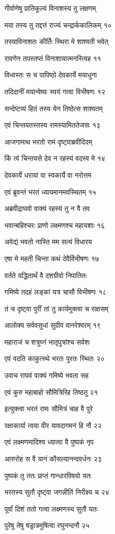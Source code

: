 गीर्वाणेषु प्रातिकूल्यं विनाशस्य तु लक्षणम्

मया तस्य तु तद्दत्तं राज्यं चन्द्रार्ककालिकम् १०

तस्याविनाशतः कीर्तिः स्थिरा मे शाश्वती भवेत्

रावणेन तपस्तप्तं विनाशायात्मनस्त्विह ११

विध्वस्तः स च पापिष्ठो देवकार्ये मयाधुना

तदिदानीं मयान्वेष्यः स्वयं गत्वा विभीषणः १२

सन्देष्टव्यं हितं तस्य येन तिष्ठेत्स शाश्वतम्

एवं चिन्तयतस्तस्य रामस्यामिततेजसः १३

आजगामाथ भरतो रामं दृष्ट्वाब्रवीदिदम्

किं त्वं चिन्तयसे देव न रहस्यं वदस्व मे १४

देवकार्ये धरायां वा स्वकार्ये वा नरोत्तम

एवं ब्रुवन्तं भरतं ध्यायमानमवस्थितम् १५

अब्रवीद्राघवो वाक्यं रहस्यं तु न वै तव

भवान्बहिश्चरः प्राणो लक्ष्मणश्च महायशाः १६

अवेद्यं भवतो नास्ति मम सत्यं विधारय

एषा मे महती चिन्ता कथं देवैर्विभीषणः १७

वर्तते यद्धितार्थं वै दशग्रीवो निपातितः

गमिष्ये तदहं लङ्कां यत्र चासौ विभीषणः १८

तं च दृष्ट्वा पुरीं तां तु कार्यमुक्त्वा च राक्षसम्

आलोक्य सर्ववसुधां सुग्रीवं वानरेश्वरम् १९

महाराजं च शत्रुघ्नं भातृपुत्रांश्च सर्वशः

एवं वदति काकुत्स्थे भरतः पुरतः स्थितः २०

उवाच राघवं वाक्यं गमिष्ये भवता सह

एवं कुरु महाबाहो सौमित्रिरिह तिष्ठतु २१

इत्युक्त्वा भरतं रामः सौमित्रं चाह वै पुरे

रक्षाकार्या त्वया वीर यावदागमनं हि नौ २२

एवं लक्ष्मणमादिश्य ध्यात्वा वै पुष्पकं नृप

आरुरोह स वै यानं कौसल्यानन्दवर्धनः २३

पुष्पकं तु ततः प्राप्तं गान्धारविषयो यतः

भरतस्य सुतौ दृष्ट्वा जगन्नीतिं निरीक्ष्य च २४

पूर्वां दिशं ततो गत्वा लक्ष्मणस्य सुतौ यतः

पुरेषु तेषु षड्रात्रमुषित्वा रघुनन्दनौ २५

